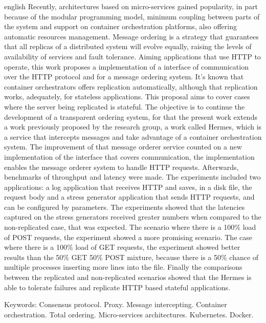 \begin{resumo}[Abstract]
\SingleSpacing
\begin{otherlanguage*}{english}
Recently, architectures based on micro-services gained popularity, in part because of the modular programming model, minimum coupling between parts of the system and support on container orchestration platforms, also offering automatic resources management. Message ordering is a strategy that guarantees that all replicas of a distributed system will evolve equally, raising the levels of availability of services and fault tolerance. Aiming applications that use \gls{HTTP} to operate, this work proposes a implementation of a interface of communication over the \gls{HTTP} protocol and for a message ordering system. It's known that container orchestrators offers replication automatically, although that replication works, adequately, for stateless applications. This proposal aims to cover cases where the server being replicated is stateful. The objective is to continue the development of a transparent ordering system, for that the present work extends a work previously proposed by the research group, a work called Hermes, which is a service that intercepts messages and take advantage of a container orchestration system. The improvement of that message orderer service counted on a new implementation of the interface that covers communication, the implementation enables the message orderer system to handle \gls{HTTP} requests. Afterwards, benchmarks of throughput and latency were made. The experiments included two applications: a log application that receives HTTP and saves, in a disk file, the request body and a stress generator application that sends HTTP requests, and can be configured by parameters. The experiments showed that the latencies captured on the stress generators received greater numbers when compared to the non-replicated case, that was expected. The scenario where there is a 100\% load of POST requests, the experiment showed a more promising scenario. The case where there is a 100\% load of GET requests, the experiment showed better results than the 50\% GET 50\% POST mixture, because there is a 50\% chance of multiple processes inserting more lines into the file. Finally the comparisons between the replicated and non-replicated scenarios showed that the Hermes is able to tolerate failures and replicate HTTP based stateful applications.

Keywords: Consensus protocol. Proxy. Message intercepting. Container orchestration. Total ordering. Micro-services architectures. Kubernetes. Docker.

\end{otherlanguage*}
\end{resumo}

